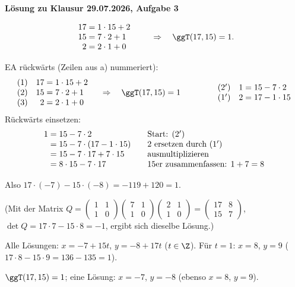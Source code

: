 \textbf{Lösung zu Klausur 29.07.2026, Aufgabe 3}

\[
\begin{array}{r@{\;=\;}l}
17 & 1 \cdot 15 + 2\\
15 & 7 \cdot 2 + 1\\
2 & 2 \cdot 1 + 0
\end{array}
\qquad\Rightarrow\quad \ggT(17, 15) = 1 .
\]

 EA rückwärts (Zeilen aus a) nummeriert):
\[
\begin{array}{lr@{\;=\;}l}
(1) & 17 & 1 \cdot 15 + 2\\
(2) & 15 & 7 \cdot 2 + 1\\
(3) & 2 & 2 \cdot 1 + 0
\end{array}
\quad\Rightarrow\quad \ggT(17, 15) = 1
\qquad\qquad
\begin{array}{lr@{\;=\;}l}
(2') & 1 & 15 - 7 \cdot 2\\
(1') & 2 & 17 - 1 \cdot 15
\end{array}
\]
Rückwärts einsetzen:
\[
\begin{array}{r@{\;}l@{\qquad}l}
1 &= 15 - 7 \cdot 2 & \text{Start: } (2')\\
  &= 15 - 7 \cdot (17 - 1 \cdot 15) & 2 \text{ ersetzen durch } (1')\\
  &= 15 - 7 \cdot 17 + 7 \cdot 15 & \text{ausmultiplizieren}\\
  &= 8 \cdot 15 - 7 \cdot 17 & 15\text{er zusammenfassen: } 1 + 7 = 8
\end{array}
\]

Also $17 \cdot (-7) - 15 \cdot (-8) = -119 + 120 = 1$.

(Mit der Matrix $Q = \begin{pmatrix}1&1\\1&0\end{pmatrix}\begin{pmatrix}7&1\\1&0\end{pmatrix}\begin{pmatrix}2&1\\1&0\end{pmatrix} = \begin{pmatrix}17&8\\15&7\end{pmatrix}$,
$\det Q = 17 \cdot 7 - 15 \cdot 8 = -1$, ergibt sich dieselbe Lösung.)

Alle Lösungen: $x = -7 + 15t$, $y = -8 + 17t$ ($t \in \Z$). Für $t = 1$: $x = 8$, $y = 9$ ($17 \cdot 8 - 15 \cdot 9 = 136 - 135 = 1$).
\begin{ergebnis} $\ggT(17,15) = 1$; eine Lösung: $x = -7$, $y = -8$ (ebenso $x = 8$, $y = 9$). \end{ergebnis}


